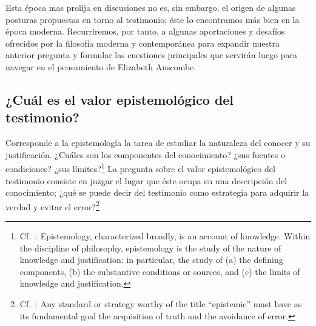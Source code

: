 Esta época mas prolija en discusiones no es, sin embargo, el origen de algunas
posturas propuestas en torno al testimonio; éste lo encontramos más bien en la
época moderna. Recurriremos, por tanto, a algunas aportaciones y desafíos
ofrecidos por la filosofía moderna y contemporánea para expandir nuestra
anterior pregunta y formular las cuestiones principales que servirán luego para
navegar en el pensamiento de Elizabeth Anscombe.

\subsection{¿Cuál es el valor epistemológico del testimonio?}
Corresponde a la epistemología la tarea de estudiar la naturaleza del conocer y
su justificación. ¿Cuáles son los componentes del conocimiento? ¿sus fuentes o
condiciones? ¿sus límites?\footnote{Cf.~\cite[3]{moser2002ep}: Epistemology,
  characterized broadly, is an account of knowledge. Within the discipline of
  philosophy, epistemology is the study of the nature of knowledge and
  justification: in particular, the study of (a) the defining components, (b)
  the substantive conditions or sources, and (c) the limits of knowledge and
  justification.} La pregunta sobre el valor epistemológico del testimonio
consiste en juzgar el lugar que éste ocupa en una descripción del conocimiento;
¿qué se puede decir del testimonio como estrategia para adquirir la verdad y
evitar el error?\footnote{Cf.~\cite[14]{moser2002ep}: Any standard or strategy
  worthy of the title ``epistemic'' must have as its fundamental goal the
  acquisition of truth and the avoidance of error.}

